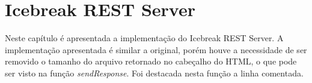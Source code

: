 \chapter{Icebreak REST Server}

Neste capítulo é apresentada a implementação do Icebreak REST Server. A implementação apresentada é similar a original, porém houve a necessidade de ser removido o tamanho do arquivo retornado no cabeçalho do HTML, o que pode ser visto na função \emph{sendResponse}. Foi destacada nesta função a linha comentada.

